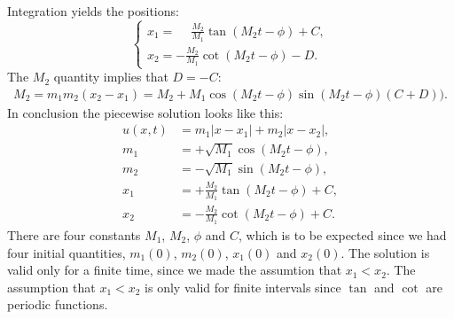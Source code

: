\documentclass[english,master]{liumaiex}
\theoremstyle{plain}
\theoremstyle{definition}
\begin{document}
%
Integration yields the positions:
\begin{equation}
\left\{ \begin{aligned}
	x_1 = \phantom{-}\frac{M_2}{M_1}\tan(M_2t - \phi) + C,\\
	x_2 = -\frac{M_2}{M_1}\cot(M_2t - \phi) - D.
\end{aligned} \right.
\end{equation}
%
The $M_2$ quantity implies that $D = -C$:
\begin{align}
	M_2 = m_1m_2(x_2 - x_1) = M_2 + M_1\cos(M_2t-\phi)\sin(M_2t-\phi)(C + D)).
\end{align}
%
In conclusion the piecewise solution looks like this:
\begin{align}
	u(x, t) &= m_1|x - x_1| + m_2|x - x_2|, \\
	m_1 &= +\sqrt{M_1} \cos(M_2t - \phi), \\
	m_2 &= -\sqrt{M_1} \sin(M_2t - \phi), \\
	x_1 &= +\frac{M_2}{M_1}\tan(M_2t - \phi) + C, \\
	x_2 &= -\frac{M_2}{M_1}\cot(M_2t - \phi) + C.
\end{align}
%
There are four constants $M_1$, $M_2$, $\phi$ and $C$, which is to be expected since we had four initial quantities, $m_1(0)$, $m_2(0)$, $x_1(0)$ and $x_2(0)$. The solution is valid only for a finite time, since we made the assumtion that $x_1 < x_2$. The assumption that $x_1 < x_2$ is only valid for finite intervals since $\tan$ and $\cot$ are periodic functions.
\end{document}
